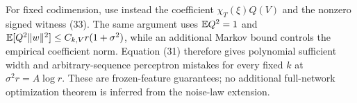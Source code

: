For fixed codimension, use instead the coefficient
$\chi_T(\xi)Q(V)$ and the nonzero signed witness (33). The same argument
uses $\mathbb E Q^2=1$ and
$\mathbb E[Q^2\|w\|^2]\le C_{k,V}r(1+\sigma^2)$, while an additional
Markov bound controls the empirical coefficient norm. Equation (31)
therefore gives polynomial sufficient width and arbitrary-sequence
perceptron mistakes for every fixed $k$ at $\sigma^2r=A\log r$.
These are frozen-feature guarantees; no additional full-network
optimization theorem is inferred from the noise-law extension.
